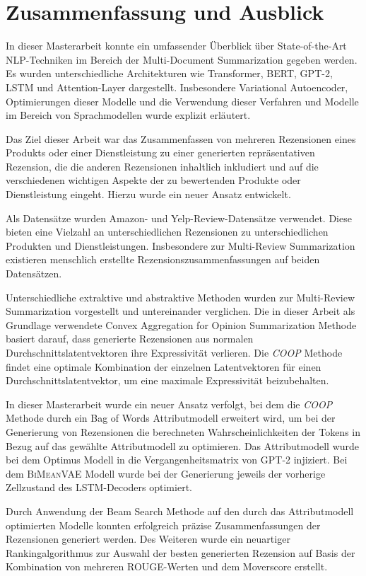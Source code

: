 \section{Zusammenfassung und Ausblick}\raggedbottom
\label{summary}
In dieser Masterarbeit konnte ein umfassender Überblick über State-of-the-Art NLP-Techniken im Bereich der Multi-Document Summarization gegeben werden.
Es wurden unterschiedliche Architekturen wie Transformer, BERT, GPT-2, LSTM und Attention-Layer dargestellt. 
Insbesondere Variational Autoencoder, Optimierungen dieser Modelle und die Verwendung dieser Verfahren und Modelle im Bereich von Sprachmodellen wurde explizit erläutert.

Das Ziel dieser Arbeit war das Zusammenfassen von mehreren Rezensionen eines Produkts oder einer Dienstleistung zu einer generierten repräsentativen Rezension, die die anderen Rezensionen inhaltlich inkludiert und auf die verschiedenen wichtigen Aspekte der zu bewertenden Produkte oder Dienstleistung eingeht.
Hierzu wurde ein neuer Ansatz entwickelt.

Als Datensätze wurden Amazon- und Yelp-Review-Datensätze verwendet. Diese bieten eine Vielzahl an unterschiedlichen Rezensionen zu unterschiedlichen Produkten und Dienstleistungen. Insbesondere zur Multi-Review Summarization existieren menschlich erstellte Rezensionszusammenfassungen auf beiden Datensätzen.

Unterschiedliche extraktive und abstraktive Methoden wurden zur Multi-Review Summarization vorgestellt und untereinander verglichen. 
Die in dieser Arbeit als Grundlage verwendete Convex Aggregation for Opinion Summarization Methode basiert darauf, dass generierte Rezensionen aus normalen Durchschnittslatentvektoren ihre Expressivität verlieren. 
Die \textit{COOP} Methode findet eine optimale Kombination der einzelnen Latentvektoren für einen Durchschnittslatentvektor, um eine maximale Expressivität beizubehalten.

In dieser Masterarbeit wurde ein neuer Ansatz verfolgt, bei dem die \textit{COOP} Methode durch ein Bag of Words Attributmodell erweitert wird, um bei der Generierung von Rezensionen die berechneten Wahrscheinlichkeiten der Tokens in Bezug auf das gewählte Attributmodell zu optimieren.
Das Attributmodell wurde bei dem Optimus Modell in die Vergangenheitsmatrix von GPT-2 injiziert. Bei dem \textsc{BiMeanVAE} Modell wurde bei der Generierung jeweils der vorherige Zellzustand des LSTM-Decoders optimiert.

Durch Anwendung der Beam Search Methode auf den durch das Attributmodell optimierten Modelle konnten erfolgreich präzise Zusammenfassungen der Rezensionen generiert werden.
Des Weiteren wurde ein neuartiger Rankingalgorithmus zur Auswahl der besten generierten Rezension auf Basis der Kombination von mehreren ROUGE-Werten und dem Moverscore erstellt.

